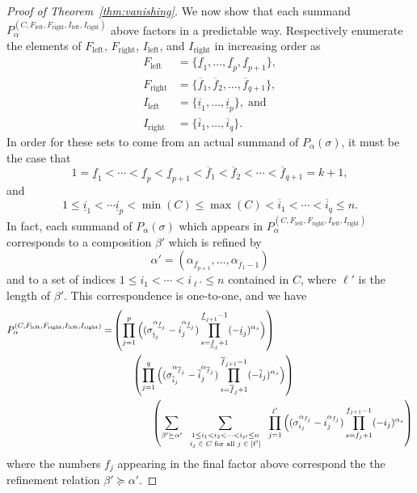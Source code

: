 \documentclass[12pt]{amsart}
\theoremstyle{definition}
\theoremstyle{remark}
\numberwithin{equation}{section}
\begin{document}
\begin{proof}[Proof of Theorem~\ref{thm:vanishing}]
We now show that each summand $P_{\alpha}^{(C, F_{\text{left}}, F_{\text{right}}, I_{\text{left}}, I_{\text{right}})}$ above factors in a predictable way.  
Respectively enumerate the elements of $F_{\text{left}}$, $F_{\text{right}}$, $I_{\text{left}}$, and $I_{\text{right}}$ in increasing order as
\begin{align*}
F_{\text{left}} &= \{\underline{f}_{1}, \ldots, \underline{f}_{p}, \underline{f}_{p+1}\}, \\
F_{\text{right}} &= \{\overline{f}_{1}, \overline{f}_{2}, \ldots, \overline{f}_{q+1} \}, \\
I_{\text{left}} &= \{\underline{i}_{1}, \ldots, \underline{i}_{p}\},\;\text{and} \\ 
I_{\text{right}} &= \{\overline{i}_{1}, \ldots, \overline{i}_{q}\}.
\end{align*}  
In order for these sets to come from an actual summand of $P_{\alpha}(\sigma)$, it must be the case that
\[
1 = \underline{f}_{1} < \cdots < \underline{f}_{p} < \underline{f}_{p + 1} < \overline{f}_{1} < \overline{f}_{2} < \cdots < \overline{f}_{q+1} = k + 1,
\]
and 
\[
1\le \underline{i}_{1} < \cdots \underline{i}_{p} < \min(C) \le \max(C) < \overline{i}_{1} < \cdots < \overline{i}_{q} \le n.
\]  
In fact, each summand of $P_{\alpha}(\sigma)$ which appears in $P_{\alpha}^{(C, F_{\text{left}}, F_{\text{right}}, I_{\text{left}}, I_{\text{right}})}$ corresponds to a composition $\beta'$ which is refined by 
\[
\alpha' = (\alpha_{\underline{f}_{p + 1}}, \ldots, \alpha_{\overline{f}_{1} -1})
\]
and to a set of indices $1 \le i_{1} < \cdots < i_{\ell'} \le n$ contained in $C$, where $\ell'$ is the length of $\beta'$.  This correspondence is one-to-one, and we have
\begin{align*}
P_{\alpha}^{(C, F_{\text{left}}, F_{\text{right}}, I_{\text{left}}, I_{\text{right}})} =& \left( 
\prod_{j = 1}^{p}
\Big(
(\sigma_{\underline{i}_{j}}^{\alpha_{\underline{f}_{j}}} - i_{j}^{\alpha_{\underline{f}_{j}}}) 
\prod_{s = \underline{f}_{j} + 1}^{\underline{f}_{j+1} - 1} (- \underline{i}_{j})^{\alpha_{s}}
\Big)  
\right) \\ 
& \hspace{2em} \left( 
\prod_{j = 1}^{q}
\Big(
(\sigma_{\overline{i}_{j}}^{\alpha_{\overline{f}_{j}}} - \overline{i}_{j}^{\alpha_{\overline{f}_{j}}}) 
\prod_{s = \overline{f}_{j} + 1}^{\overline{f}_{j+1} - 1} (- \overline{i}_{j})^{\alpha_{s}}
\Big) 
\right) \\
& \hspace{4em} \left(
\sum_{\beta' \succeq \alpha'} 
\hspace{0.6em}
\sum_{\substack{ 1 \le i_{1} < i_{2} < \cdots < i_{\ell'} \le n\\ \text{$i_{j} \in C$ for all $j \in [\ell']$} }} 
\hspace{0.6em}
\prod_{j = 1}^{\ell'}
\Big(
(\sigma_{i_{j}}^{\alpha_{f_{j}}} - i_{j}^{\alpha_{f_{j}}}) 
\prod_{s = f_{j} + 1}^{f_{j+1} - 1} (- i_{j})^{\alpha_{s}}
\right)
\end{align*}
where the numbers $f_{j}$ appearing in the final factor above correspond the the refinement relation $\beta' \succeq \alpha'$.  


\end{proof}
\end{document}
